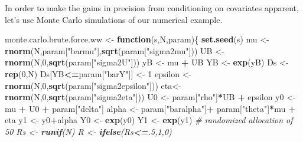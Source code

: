 \documentclass[]{book}
\newenvironment{Shaded}{\begin{snugshade}}{\end{snugshade}}
\newcommand{\KeywordTok}[1]{\textcolor[rgb]{0.13,0.29,0.53}{\textbf{#1}}}
\newcommand{\DecValTok}[1]{\textcolor[rgb]{0.00,0.00,0.81}{#1}}
\newcommand{\StringTok}[1]{\textcolor[rgb]{0.31,0.60,0.02}{#1}}
\newcommand{\CommentTok}[1]{\textcolor[rgb]{0.56,0.35,0.01}{\textit{#1}}}
\newcommand{\ControlFlowTok}[1]{\textcolor[rgb]{0.13,0.29,0.53}{\textbf{#1}}}
\newcommand{\OperatorTok}[1]{\textcolor[rgb]{0.81,0.36,0.00}{\textbf{#1}}}
\newcommand{\NormalTok}[1]{#1}
\theoremstyle{definition}
\theoremstyle{definition}
\theoremstyle{definition}
\theoremstyle{remark}
\let\BeginKnitrBlock\begin \let\EndKnitrBlock\end
\begin{document}
\BeginKnitrBlock{example}
\protect\hypertarget{exm:unnamed-chunk-74}{}{\label{exm:unnamed-chunk-74}
}In order to make the gains in precision from conditioning on covariates
apparent, let's use Monte Carlo simulations of our numerical example.
\EndKnitrBlock{example}

\begin{Shaded}
\begin{Highlighting}[]
\NormalTok{monte.carlo.brute.force.ww <-}\StringTok{ }\ControlFlowTok{function}\NormalTok{(s,N,param)\{}
  \KeywordTok{set.seed}\NormalTok{(s)}
\NormalTok{  mu <-}\StringTok{ }\KeywordTok{rnorm}\NormalTok{(N,param[}\StringTok{"barmu"}\NormalTok{],}\KeywordTok{sqrt}\NormalTok{(param[}\StringTok{"sigma2mu"}\NormalTok{]))}
\NormalTok{  UB <-}\StringTok{ }\KeywordTok{rnorm}\NormalTok{(N,}\DecValTok{0}\NormalTok{,}\KeywordTok{sqrt}\NormalTok{(param[}\StringTok{"sigma2U"}\NormalTok{]))}
\NormalTok{  yB <-}\StringTok{ }\NormalTok{mu }\OperatorTok{+}\StringTok{ }\NormalTok{UB }
\NormalTok{  YB <-}\StringTok{ }\KeywordTok{exp}\NormalTok{(yB)}
\NormalTok{  Ds <-}\StringTok{ }\KeywordTok{rep}\NormalTok{(}\DecValTok{0}\NormalTok{,N)}
\NormalTok{  Ds[YB}\OperatorTok{<=}\NormalTok{param[}\StringTok{"barY"}\NormalTok{]] <-}\StringTok{ }\DecValTok{1} 
\NormalTok{  epsilon <-}\StringTok{ }\KeywordTok{rnorm}\NormalTok{(N,}\DecValTok{0}\NormalTok{,}\KeywordTok{sqrt}\NormalTok{(param[}\StringTok{"sigma2epsilon"}\NormalTok{]))}
\NormalTok{  eta<-}\StringTok{ }\KeywordTok{rnorm}\NormalTok{(N,}\DecValTok{0}\NormalTok{,}\KeywordTok{sqrt}\NormalTok{(param[}\StringTok{"sigma2eta"}\NormalTok{]))}
\NormalTok{  U0 <-}\StringTok{ }\NormalTok{param[}\StringTok{"rho"}\NormalTok{]}\OperatorTok{*}\NormalTok{UB }\OperatorTok{+}\StringTok{ }\NormalTok{epsilon}
\NormalTok{  y0 <-}\StringTok{ }\NormalTok{mu }\OperatorTok{+}\StringTok{  }\NormalTok{U0 }\OperatorTok{+}\StringTok{ }\NormalTok{param[}\StringTok{"delta"}\NormalTok{]}
\NormalTok{  alpha <-}\StringTok{ }\NormalTok{param[}\StringTok{"baralpha"}\NormalTok{]}\OperatorTok{+}\StringTok{  }\NormalTok{param[}\StringTok{"theta"}\NormalTok{]}\OperatorTok{*}\NormalTok{mu }\OperatorTok{+}\StringTok{ }\NormalTok{eta}
\NormalTok{  y1 <-}\StringTok{ }\NormalTok{y0}\OperatorTok{+}\NormalTok{alpha}
\NormalTok{  Y0 <-}\StringTok{ }\KeywordTok{exp}\NormalTok{(y0)}
\NormalTok{  Y1 <-}\StringTok{ }\KeywordTok{exp}\NormalTok{(y1)}
  \CommentTok{# randomized allocation of 50% of individuals}
\NormalTok{  Rs <-}\StringTok{ }\KeywordTok{runif}\NormalTok{(N)}
\NormalTok{  R <-}\StringTok{ }\KeywordTok{ifelse}\NormalTok{(Rs}\OperatorTok{<=}\NormalTok{.}\DecValTok{5}\NormalTok{,}\DecValTok{1}\NormalTok{,}\DecValTok{0}\NormalTok{)}
}
\end{Highlighting}
\end{Shaded}
\end{document}
